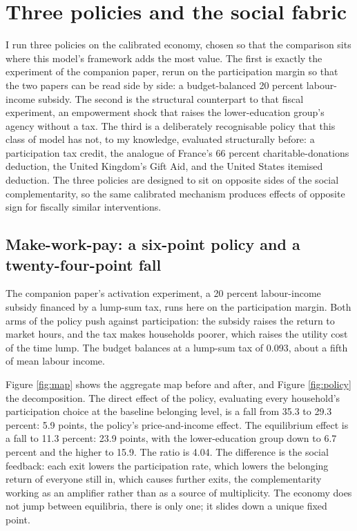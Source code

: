 \documentclass[11pt]{article}
\begin{document}
\section{Three policies and the social fabric}

I run three policies on the calibrated economy, chosen so that the comparison sits where this model's framework adds the most value. The first is exactly the experiment of the companion paper, rerun on the participation margin so that the two papers can be read side by side: a budget-balanced 20 percent labour-income subsidy. The second is the structural counterpart to that fiscal experiment, an empowerment shock that raises the lower-education group's agency without a tax. The third is a deliberately recognisable policy that this class of model has not, to my knowledge, evaluated structurally before: a participation tax credit, the analogue of France's 66 percent charitable-donations deduction, the United Kingdom's Gift Aid, and the United States itemised deduction. The three policies are designed to sit on opposite sides of the social complementarity, so the same calibrated mechanism produces effects of opposite sign for fiscally similar interventions.

\subsection{Make-work-pay: a six-point policy and a twenty-four-point fall}

The companion paper's activation experiment, a 20 percent labour-income subsidy financed by a lump-sum tax, runs here on the participation margin. Both arms of the policy push against participation: the subsidy raises the return to market hours, and the tax makes households poorer, which raises the utility cost of the time lump. The budget balances at a lump-sum tax of 0.093, about a fifth of mean labour income.

Figure \ref{fig:map} shows the aggregate map before and after, and Figure \ref{fig:policy} the decomposition. The direct effect of the policy, evaluating every household's participation choice at the baseline belonging level, is a fall from 35.3 to 29.3 percent: 5.9 points, the policy's price-and-income effect. The equilibrium effect is a fall to 11.3 percent: 23.9 points, with the lower-education group down to 6.7 percent and the higher to 15.9. The ratio is 4.04. The difference is the social feedback: each exit lowers the participation rate, which lowers the belonging return of everyone still in, which causes further exits, the complementarity working as an amplifier rather than as a source of multiplicity. The economy does not jump between equilibria, there is only one; it slides down a unique fixed point.
\end{document}
